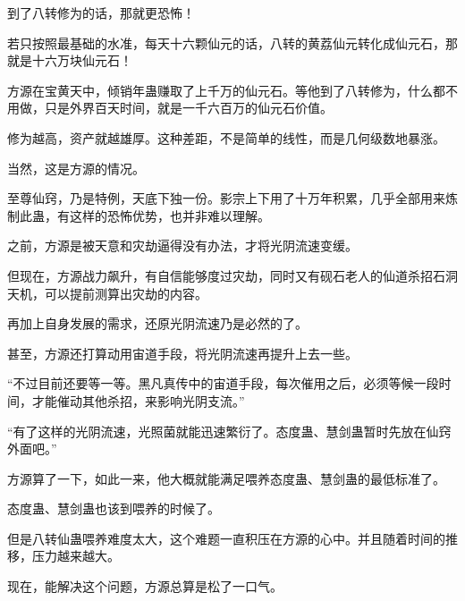 \begin{this_body}
到了八转修为的话，那就更恐怖！

若只按照最基础的水准，每天十六颗仙元的话，八转的黄荔仙元转化成仙元石，那就是十六万块仙元石！

方源在宝黄天中，倾销年蛊赚取了上千万的仙元石。等他到了八转修为，什么都不用做，只是外界百天时间，就是一千六百万的仙元石价值。

修为越高，资产就越雄厚。这种差距，不是简单的线性，而是几何级数地暴涨。

当然，这是方源的情况。

至尊仙窍，乃是特例，天底下独一份。影宗上下用了十万年积累，几乎全部用来炼制此蛊，有这样的恐怖优势，也并非难以理解。

之前，方源是被天意和灾劫逼得没有办法，才将光阴流速变缓。

但现在，方源战力飙升，有自信能够度过灾劫，同时又有砚石老人的仙道杀招石洞天机，可以提前测算出灾劫的内容。

再加上自身发展的需求，还原光阴流速乃是必然的了。

甚至，方源还打算动用宙道手段，将光阴流速再提升上去一些。

“不过目前还要等一等。黑凡真传中的宙道手段，每次催用之后，必须等候一段时间，才能催动其他杀招，来影响光阴支流。”

“有了这样的光阴流速，光照菌就能迅速繁衍了。态度蛊、慧剑蛊暂时先放在仙窍外面吧。”

方源算了一下，如此一来，他大概就能满足喂养态度蛊、慧剑蛊的最低标准了。

态度蛊、慧剑蛊也该到喂养的时候了。

但是八转仙蛊喂养难度太大，这个难题一直积压在方源的心中。并且随着时间的推移，压力越来越大。

现在，能解决这个问题，方源总算是松了一口气。

\end{this_body}

